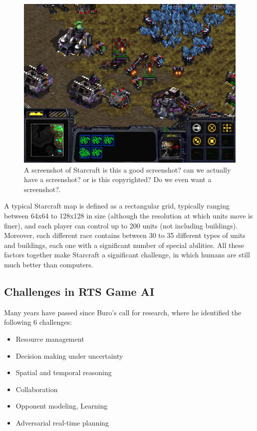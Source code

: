 \documentclass[journal]{IEEEtran}
\begin{document}
\begin{figure}
    \centering
    \includegraphics[width=0.8\columnwidth]{figures/starcraft1.png}
    \caption{A screenshot of Starcraft {\color{red} is this a good screenshot? can we actually have a screenshot? or is this copyrighted? Do we even want a screenshot?}.}
    \label{fig:starcraft}
\end{figure}

{\color{red} A typical Starcraft map is defined as a rectangular grid, typically ranging between 64x64 to 128x128 in size (although the resolution at which units move is finer), and each player can control up to 200 units (not including buildings). Moreover, each different race contains between 30 to 35 different types of units and buildings, each one with a significant number of special abilities}. All these factors together make Starcraft a significant challenge, in which humans are still much better than computers.

\subsection{Challenges in RTS Game AI}\label{subsec:challenges}

Many years have passed since Buro's call for research, where he identified the following 6 challenges:
\begin{itemize}
\item Resource management
\item Decision making under uncertainty
\item Spatial and temporal reasoning
\item Collaboration
\item Opponent modeling, Learning
\item Adversarial real-time planning
\end{itemize}
\end{document}
